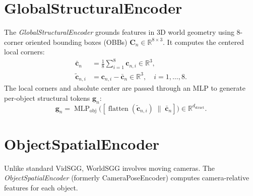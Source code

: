 \documentclass{article}
\newcommand{\mR}{\mathbb{R}}
\newcommand{\op}[1]{\operatorname{#1}}
\newcommand{\mat}[1]{\bm{#1}}
\begin{document}
\section{GlobalStructuralEncoder}
\label{sec:gse}

The \emph{GlobalStructuralEncoder} grounds features in 3D world geometry using 8-corner oriented bounding boxes (OBBs) $\mat{C}_n \in \mR^{8 \times 3}$. It computes the centered local corners:
\begin{align}
    \bar{\mat{c}}_n &= \frac{1}{8}\sum_{i=1}^{8}\mat{c}_{n,i} \in \mR^{3}, \label{eq:center} \\
    \tilde{\mat{c}}_{n,i} &= \mat{c}_{n,i} - \bar{\mat{c}}_n \in \mR^{3}, \quad i=1,\dots,8. \label{eq:local}
\end{align}
The local corners and absolute center are passed through an MLP to generate per-object structural tokens $\mat{g}_n$:
\begin{equation}
    \mat{g}_n = \op{MLP}_{\text{obj}}\bigl([\op{flatten}(\tilde{\mat{c}}_{n,i}) \;\|\; \bar{\mat{c}}_n]\bigr) \in \mR^{d_{\text{struct}}}.
    \label{eq:gse_obj}
\end{equation}

\section{ObjectSpatialEncoder}
\label{sec:ose}

Unlike standard VidSGG, WorldSGG involves moving cameras. The \emph{ObjectSpatialEncoder} (formerly CameraPoseEncoder) computes camera-relative features for each object.
\end{document}
